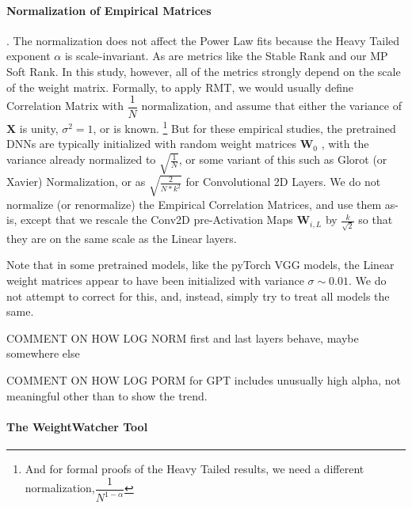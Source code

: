 \paragraph{Normalization of Empirical Matrices}.  
The normalization does not affect the Power Law fits because the Heavy Tailed exponent $\alpha$ is scale-invariant.
As are metrics like the Stable Rank and our MP Soft Rank. In this study, however, all of the metrics strongly depend 
on the scale of the weight matrix.
Formally, to apply RMT, we would usually define Correlation Matrix with $\dfrac{1}{N}$ normalization,
and assume that either the variance of $\mathbf{X}$ is unity, $\sigma^{2}=1$, or is known.
\footnote{And for formal proofs of the Heavy Tailed results, we need a different normalization,$\dfrac{1}{N^{1-\alpha}}$}
But for these empirical studies, the pretrained DNNs are typically initialized with random weight matrices $\mathbf{W}_{0}$ ,
with the variance already normalized to $\sqrt{\frac{1}{N}}$, or some variant of this such as Glorot (or Xavier) Normalization\cite{GloRot},
or as $\sqrt{\frac{2}{N*k^2}}$ for Convolutional 2D Layers. 
We do not normalize (or renormalize) the Empirical Correlation Matrices, and use them as-is,
except that we rescale the Conv2D pre-Activation Maps $\mathbf{W}_{i,L}$ by $\frac{k}{\sqrt{2}}$ so that they
are on the same scale as the Linear layers.


Note that in some pretrained models, like the pyTorch VGG models, the Linear weight matrices appear to have been 
initialized with variance $\sigma\sim0.01$.  We do not attempt to correct for this, and, instead, simply try to treat all
models the same.  

COMMENT ON HOW LOG NORM first and last layers behave, maybe somewhere else

COMMENT ON HOW LOG PORM  for GPT includes unusually high alpha, not meaningful other than to show the trend.

\paragraph{The WeightWatcher Tool}


